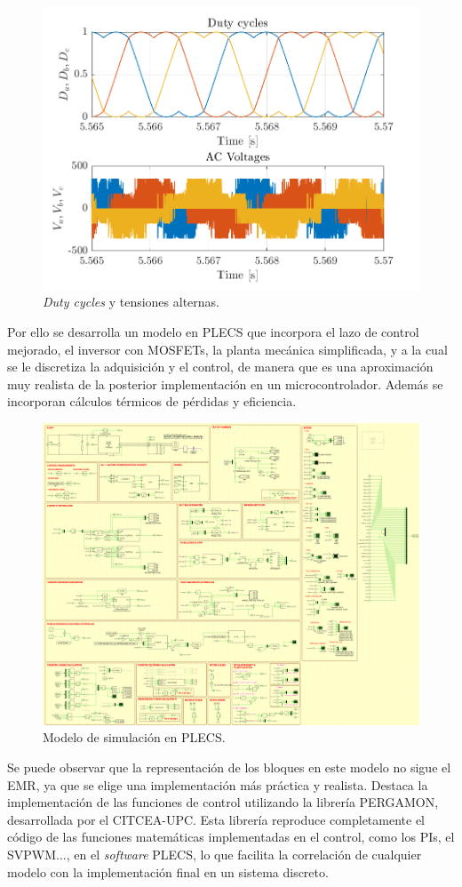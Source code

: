 \begin{figure}[H]
    \centering
    \includegraphics[width=0.85\linewidth]{fig/abc_plot.png}
    \caption{\textit{Duty cycles} y tensiones alternas.}
    
\end{figure}


Por ello se desarrolla un modelo en PLECS que incorpora el lazo de control mejorado, el inversor con MOSFETs, la planta mecánica simplificada, y a la cual se le discretiza la adquisición y el control, de manera que es una aproximación muy realista de la posterior implementación en un microcontrolador. Además se incorporan cálculos térmicos de pérdidas y eficiencia.

\begin{figure}[H]
	\centering
	\includegraphics[width=0.7\linewidth]{fig/PLECS_overall}
	\caption{Modelo de simulación en PLECS.}
\end{figure}


Se puede observar que la representación de los bloques en este modelo no sigue el EMR, ya que se elige una implementación más práctica y realista. Destaca la implementación de las funciones de control utilizando la librería PERGAMON, desarrollada por el CITCEA-UPC. Esta librería reproduce completamente el código de las funciones matemáticas implementadas en el control, como los PIs, el SVPWM..., en el \textit{software} PLECS, lo que facilita la correlación de cualquier modelo con la implementación final en un sistema discreto.


